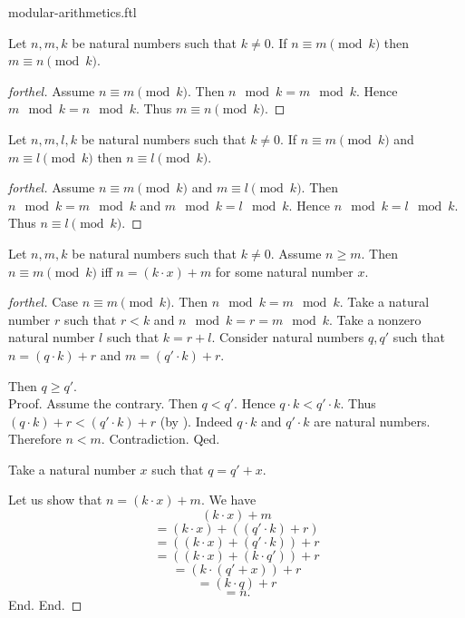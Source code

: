 \documentclass{naproche-library}
\begin{document}
\begin{smodule}{modular-arithmetics.ftl}
  \begin{proposition}[forthel,id=ARITHMETIC_08_2337210737098752,printid]
    Let $n, m, k$ be natural numbers such that $k \neq 0$.
    If $n \equiv m \pmod{k}$ then $m \equiv n \pmod{k}$.
  \end{proposition}
  \begin{proof}[forthel]
    Assume $n \equiv m \pmod{k}$.
    Then $n \mod k = m \mod k$.
    Hence $m \mod k = n \mod k$.
    Thus $m \equiv n \pmod{k}$.
  \end{proof}

  \begin{proposition}[forthel,id=ARITHMETIC_08_7464329746055168,printid]
    Let $n, m, l, k$ be natural numbers such that $k \neq 0$.
    If $n \equiv m \pmod{k}$ and $m \equiv l \pmod{k}$ then $n \equiv l \pmod{k}$.
  \end{proposition}
  \begin{proof}[forthel]
    Assume $n \equiv m \pmod{k}$ and $m \equiv l \pmod{k}$.
    Then $n \mod k = m \mod k$ and $m \mod k = l \mod k$.
    Hence $n \mod k = l \mod k$.
    Thus $n \equiv l \pmod{k}$.
  \end{proof}

  \begin{proposition}[forthel,id=ARITHMETIC_08_2034122983735296,printid]
    Let $n, m, k$ be natural numbers such that $k \neq 0$.
    Assume $n \geq m$.
    Then $n \equiv m \pmod{k}$ iff $n = (k \cdot x) + m$ for some natural number $x$.
  \end{proposition}
  \begin{proof}[forthel]
    Case $n \equiv m \pmod{k}$.
      Then $n \mod k = m \mod k$.
      Take a natural number $r$ such that $r < k$ and $n \mod k = r = m \mod k$.
      Take a nonzero natural number $l$ such that $k = r + l$.
      Consider natural numbers $q,q'$ such that $n = (q \cdot k) + r$ and $m = (q' \cdot k) + r$.

      Then $q \geq q'$. \\
      Proof.
        Assume the contrary.
        Then $q < q'$.
        Hence $q \cdot k < q' \cdot k$.
        Thus $(q \cdot k) + r < (q' \cdot k) + r$ (by ).
        Indeed $q \cdot k$ and $q' \cdot k$ are natural numbers.
        Therefore $n < m$.
        Contradiction.
      Qed.

      Take a natural number $x$ such that $q = q' + x$.

      Let us show that $n = (k \cdot x) + m$.
        We have
        \[  (k \cdot x) + m                       \]
        \[    = (k \cdot x) + ((q' \cdot k) + r)  \]
        \[    = ((k \cdot x) + (q' \cdot k)) + r  \]
        \[    = ((k \cdot x) + (k \cdot q')) + r  \]
        \[    = (k \cdot (q' + x)) + r            \]
        \[    = (k \cdot q) + r                   \]
        \[    = n.                                \]
      End.
    End.


\end{proof}
\end{smodule}
\end{document}
